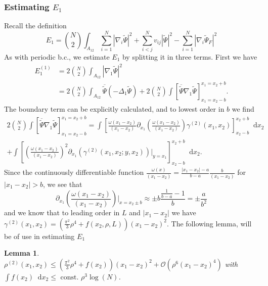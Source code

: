 \documentclass[a4paper,11pt]{article}
\newcommand{\abs}[1]{\left\lvert #1 \right\rvert}
\newcommand*\diff{\mathop{}\!\mathrm{d}}
\newtheorem{lemma}{Lemma}
\numberwithin{equation}{section}
\begin{document}
	\subsubsection{Estimating $ E_1 $}
		Recall the definition \begin{equation}
		E_1=\binom{N}{2}\int_{A_{12}} \sum_{i=1}^{N}\abs{\nabla_i\tilde{\Psi}}^2+\sum_{i<j}^{N}v_{ij}\abs{\tilde{\Psi}}^2-\sum_{i=1}^{N}\abs{\nabla_i\tilde{\Psi}_F}^2
		\end{equation}
		As with periodic b.c., we estimate $ E_1 $ by splitting it in three terms. First we have \begin{equation}
		\begin{aligned}
		E_1^{(1)}&=2\binom{N}{2}\int_{A_{12}}\abs{\nabla_1\tilde{\Psi}}^2\\&
		=2\binom{N}{2}\int_{A_{12}}\overline{\tilde{\Psi}}\left( -\Delta_1 \tilde{\Psi} \right)+2\binom{N}{2}\int\left[\overline{\tilde{\Psi}}\nabla_1\tilde{\Psi}\right]_{x_1=x_2-b}^{x_1=x_2+b}.
		\end{aligned}
		\end{equation}
		The boundary term can be explicitly calculated, and to lowest order in $ b $ we find \begin{equation}
		\begin{aligned}
		2\binom{N}{2}\int\left[\overline{\tilde{\Psi}}\nabla_1\tilde{\Psi}\right]_{x_1=x_2-b}^{x_1=x_2+b}=\int\left[\frac{\omega(x_1-x_2)}{(x_1-x_2)}\partial_{x_1}\left(\frac{\omega(x_1-x_2)}{(x_1-x_2)}\right)\gamma^{(2)}(x_1,x_2)\right]_{x_2-b}^{x_2+b}\diff x_2\\+\int\left[\left(\frac{\omega(x_1-x_2)}{(x_1-x_2)}\right)^2\partial_{x_1}\left(\gamma^{(2)}(x_1,x_2;y,x_2)\right)\bigg\vert_{y=x_1}\right]_{x_2-b}^{x_2+b}\diff x_2.
		\end{aligned}
		\end{equation}
		Since the continuously differentiable function $ \frac{\omega(x)}{(x_1-x_2)}=\frac{\abs{x_1-x_2}-a}{b-a}\frac{b}{(x_1-x_2)} $ for $ \abs{x_1-x_2}>b $, we see that \begin{equation}
		\partial_{x_1}\left(\frac{\omega(x_1-x_2)}{(x_1-x_2)}\right)\bigg\vert_{x=x_2\pm b}\approx\pm b\frac{\frac{1}{b-a}-1}{ b}=\pm\frac{a}{b^2}
		\end{equation}
		and we know that to leading order in $ L $ and $ \abs{x_1-x_2} $ we have $ \gamma^{(2)}(x_1,x_2)=(\frac{\pi^2}{3}\rho^4+f(x_2,\rho,L)) (x_1-x_2)^2 $. The following lemma, will be of use in estimating $ E_1 $
		\begin{lemma}\label{Lemma rho2 bound}
			$ \rho^{(2)}(x_1,x_2)\leq\left(\frac{\pi^2}{3}\rho^4+f(x_2)\right)(x_1-x_2)^2+\mathcal{O}(\rho^6(x_1-x_2)^4) $ with $ \int f(x_2)\diff x_2\leq \text{ const. }\rho^3\log(N) $.
		\end{lemma}
\end{document}
